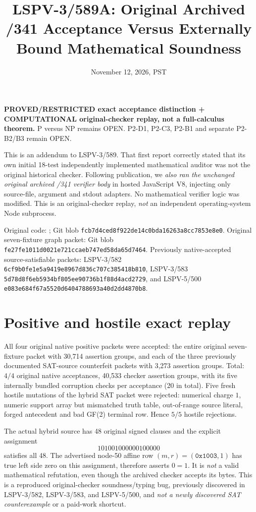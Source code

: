 \documentclass[10pt]{article}
\title{LSPV-3/589A: Original Archived /341 Acceptance Versus Externally Bound Mathematical Soundness}
\date{November 12, 2026, PST}
\begin{document}
\maketitle
\noindent\textbf{PROVED/RESTRICTED exact acceptance distinction + COMPUTATIONAL original-checker replay, not a full-calculus theorem.}
P versus NP remains OPEN. P2-D1, P2-C3, P2-B1 and separate P2-B2/B3 remain OPEN.

This is an addendum to LSPV-3/589. That first report correctly stated that
its own initial 18-test independently implemented mathematical auditor was
not the original historical checker. Following publication, we
\emph{also ran the unchanged original archived /341 verifier body} in
hosted JavaScript V8, injecting only source-file, argument and stdout
adapters. No mathematical verifier logic was modified. This is an
original-checker replay, \emph{not} an independent operating-system
Node subprocess.

Original code: ;
Git blob \texttt{fcb7d4ced8f922de14c0bda16263a8cc7853e8e0}.
Original seven-fixture graph packet: Git blob
\texttt{fe27fe1011d0021e721ccaeb747ed58da65d7464}.
Previously native-accepted source-satisfiable packets:
LSPV-3/582 \texttt{6cf9b0fe1e5a9419e8967d836c707c385418b810},
LSPV-3/583 \texttt{5d78d8f6eb5934bf805ee90736b1f88d4acd2729},
and LSPV-5/500
\texttt{e083e684f67a5520d6404788693a40d2dd4870b8}.

\section*{Positive and hostile exact replay}
All four original native positive packets were accepted:
the entire original seven-fixture packet with 30,714 assertion
groups, and each of the three previously documented SAT-source
counterfeit packets with 3,273 assertion groups. Total:
$4/4$ original native acceptances, 40,533 checker assertion
groups, with its five internally bundled corruption checks
per acceptance (20 in total). Five fresh hostile mutations of
the hybrid SAT packet were rejected: numerical charge $1$,
numeric support array but mismatched truth table, out-of-range
source literal, forged antecedent and bad GF(2) terminal row.
Hence $5/5$ hostile rejections.

The actual hybrid source has 48 original signed clauses
and the explicit assignment
\[
101001000000100000
\]
satisfies all 48. The advertised node-50 affine row
$(m,r)=(\mathtt{0x1003},1)$ has true left side zero on this
assignment, therefore asserts $0=1$. It is \emph{not} a valid
mathematical refutation, even though the archived checker
accepts its bytes. This is a reproduced original-checker
soundness/typing bug, previously discovered in LSPV-3/582,
LSPV-3/583, and LSPV-5/500, and \emph{not a newly discovered
SAT counterexample} or a paid-work shortcut.
\end{document}
